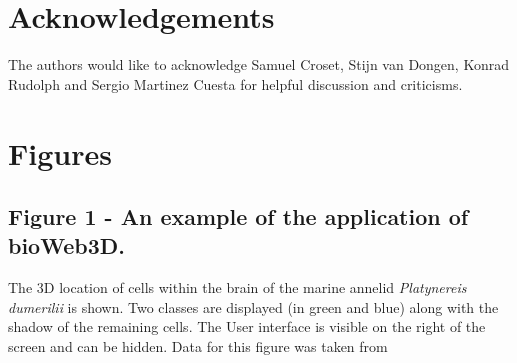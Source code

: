 \documentclass[10pt]{bmc_article}
\newenvironment{bmcformat}{\baselineskip20pt\sloppy\setboolean{publ}{false}}{\baselineskip20pt\sloppy}
\begin{document}
\begin{bmcformat}
    

\section*{Acknowledgements}
The authors would like to acknowledge Samuel Croset, Stijn van Dongen, Konrad Rudolph and Sergio Martinez Cuesta for helpful discussion and criticisms.
 

\newpage
{
   }     %





\section*{Figures}
  \subsection*{Figure 1 - An example of the application of bioWeb3D.}
	The 3D location of cells within the brain of the marine annelid {\it{Platynereis dumerilii}} is shown. Two classes are displayed (in green and blue) along with the shadow of the remaining cells. The User interface is visible on the right of the screen and can be hidden. Data for this figure was taken from \cite{Tomer10}



\end{bmcformat}
\end{document}
